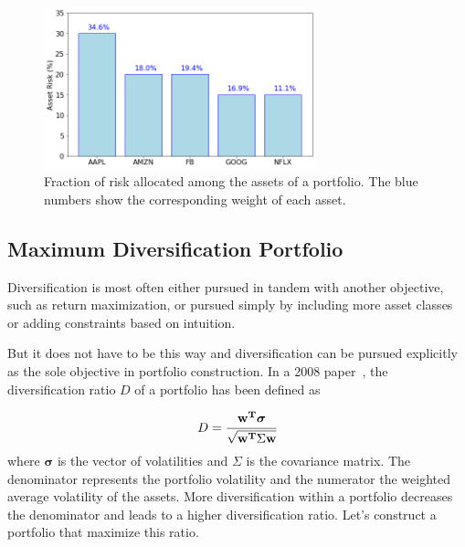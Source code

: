 \begin{figure}[htb]
	\centering
	\includegraphics[width=0.7\textwidth]{figures/risk_allocation}
	\caption{Fraction of risk allocated among the assets of a portfolio. The blue numbers show the corresponding weight of each asset.}
	\label{fig:risk_allocation}
\end{figure}

\subsection{Maximum Diversification Portfolio}
\label{maximum-diversification-portfolio}

Diversification is most often either pursued in tandem with another objective, such as return maximization, or pursued simply by including more asset classes or adding constraints based on intuition.

But it does not have to be this way and diversification can be pursued explicitly as the sole objective in portfolio construction.
In a 2008 paper~\cite{bib:diversification}, the diversification ratio $D$ of a portfolio has been defined as

\begin{equation}
D=\cfrac{\mathbf{w^T}\boldsymbol{\sigma}}{\sqrt {\mathbf{w^T}\Sigma \mathbf{w}}} 
\end{equation}
where $\boldsymbol{\sigma}$ is the vector of volatilities and $\Sigma$ is the covariance matrix. The denominator represents the portfolio volatility and the numerator the weighted average volatility of the assets. More diversification within a portfolio decreases the denominator and leads to a higher diversification ratio.
Let's construct a portfolio that maximize this ratio.


